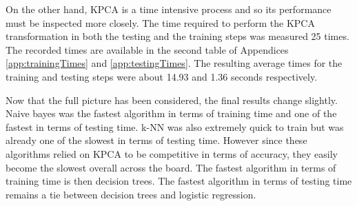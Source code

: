 On the other hand, KPCA is a time intensive process and so its performance must be inspected more closely. The time required to perform the KPCA transformation in both the testing and the training steps was measured 25 times. The recorded times are available in the second table of Appendices \ref{app:trainingTimes} and \ref{app:testingTimes}. The resulting average times for the training and testing steps were about 14.93 and 1.36 seconds respectively.

Now that the full picture has been considered, the final results change slightly. Naive bayes was the fastest algorithm in terms of training time and one of the fastest in terms of testing time. k-NN was also extremely quick to train but was already one of the slowest in terms of testing time. However since these algorithms relied on KPCA to be competitive in terms of accuracy, they easily become the slowest overall across the board. The fastest algorithm in terms of training time is then decision trees. The fastest algorithm in terms of testing time remains a tie between decision trees and logistic regression.
